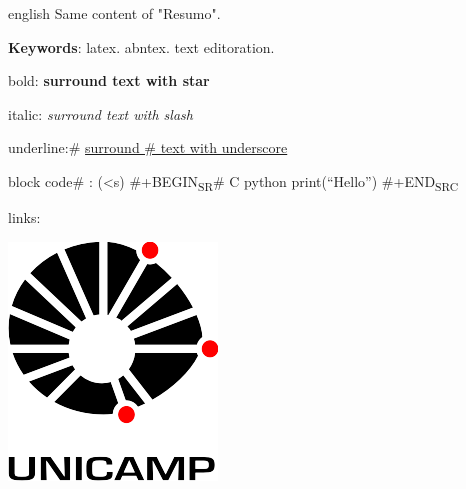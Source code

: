 \documentclass[12pt,oneside,a4paper,english]{abntex2}
\let\printglossary\relax
\begin{document}
\begin{resumo}[Abstract]
 \begin{otherlanguage*}{english}
   Same content of "Resumo".

   \vspace{\onelineskip}

   \noindent
   \textbf{Keywords}: latex. abntex. text editoration.
 \end{otherlanguage*}
\end{resumo}


\listoffigures*
\cleardoublepage


\listoftables*
\cleardoublepage


\printglossary[type=\acronymtype,title=\{List of Abbreviations\}]
\cleardoublepage

\printglossary[type=simbolos,title=\{List of Symbols\}]
\cleardoublepage


\tableofcontents*
\cleardoublepage


\textual

bold:
\textbf{surround text with star}

italic:
\emph{surround text with slash}

underline:\#
\uline{surround \# text with underscore}

block code\# : (<s)
\#+BEGIN\textsubscript{SR}\# C python
print(``Hello'')
\#+END\textsubscript{SRC}

links: \begin{center}
\includegraphics[width=.9\linewidth]{./figures/unicamp4.png}
\end{center}
\end{document}
